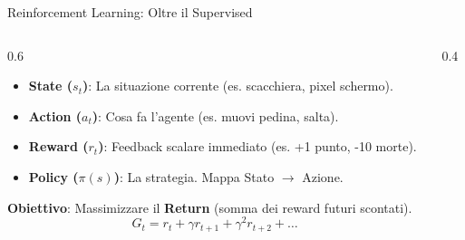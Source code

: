 \documentclass[aspectratio=169, 10pt]{beamer}
\begin{document}
\begin{frame}{Reinforcement Learning: Oltre il Supervised}
    \begin{columns}[T]
        \begin{column}{0.6\textwidth}
            \begin{itemize}
                \item \textbf{State ($s_t$)}: La situazione corrente (es. scacchiera, pixel schermo).
                \item \textbf{Action ($a_t$)}: Cosa fa l'agente (es. muovi pedina, salta).
                \item \textbf{Reward ($r_t$)}: Feedback scalare immediato (es. +1 punto, -10 morte).
                \item \textbf{Policy ($\pi(s)$)}: La strategia. Mappa Stato $\to$ Azione.
            \end{itemize}
            \vspace{0.5em}
            \textbf{Obiettivo}: Massimizzare il \textbf{Return} (somma dei reward futuri scontati).
            \[ G_t = r_t + \gamma r_{t+1} + \gamma^2 r_{t+2} + \dots \]
        \end{column}
        \begin{column}{0.4\textwidth}
            \centering
        \end{column}
    \end{columns}
\end{frame}
\end{document}
